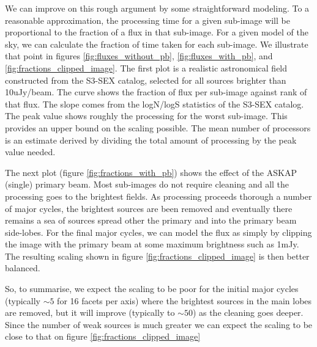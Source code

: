\documentclass[11pt,a4paper,variablewidth]{article}
\begin{document}
We can improve on this rough argument by some straightforward modeling. To a reasonable approximation, the processing time for a given sub-image will be proportional to the fraction of a flux in that sub-image. For a given model of the sky, we can calculate the fraction of time taken for each sub-image. We illustrate that point in figures \ref{fig:fluxes_without_pb}, \ref{fig:fluxes_with_pb}, and \ref{fig:fractions_clipped_image}. The first plot is a realistic astronomical field constructed from the S3-SEX catalog, selected for all sources brighter than 10uJy/beam. The curve shows the fraction of flux per sub-image against rank of that flux. The slope comes from the logN/logS statistics of the S3-SEX catalog. The peak value shows roughly the processing for the worst sub-image. This provides an upper bound on the scaling possible. The mean number of processors is an estimate derived by dividing the total amount of processing by the peak value needed.

The next plot (figure \ref{fig:fractions_with_pb}) shows the effect of the ASKAP (single) primary beam. Most sub-images do not require cleaning and all the processing goes to the brightest fields. As processing proceeds thorough a number of major cycles, the brightest sources are been removed and eventually there remains a sea of sources spread other the primary and into the primary beam side-lobes. For the final major cycles, we can model the flux as simply by clipping the image with the primary beam at some maximum brightness such as 1mJy. The resulting scaling shown in figure \ref{fig:fractions_clipped_image} is then better balanced.

So, to summarise, we expect the scaling to be poor for the initial major cycles (typically $\sim 5$ for 16 facets per axis) where the brightest sources in the main lobes are removed, but it will improve (typically to $\sim 50$) as the cleaning goes deeper. Since the number of weak sources is much greater we can expect the scaling to be close to that on figure \ref{fig:fractions_clipped_image}
\end{document}

